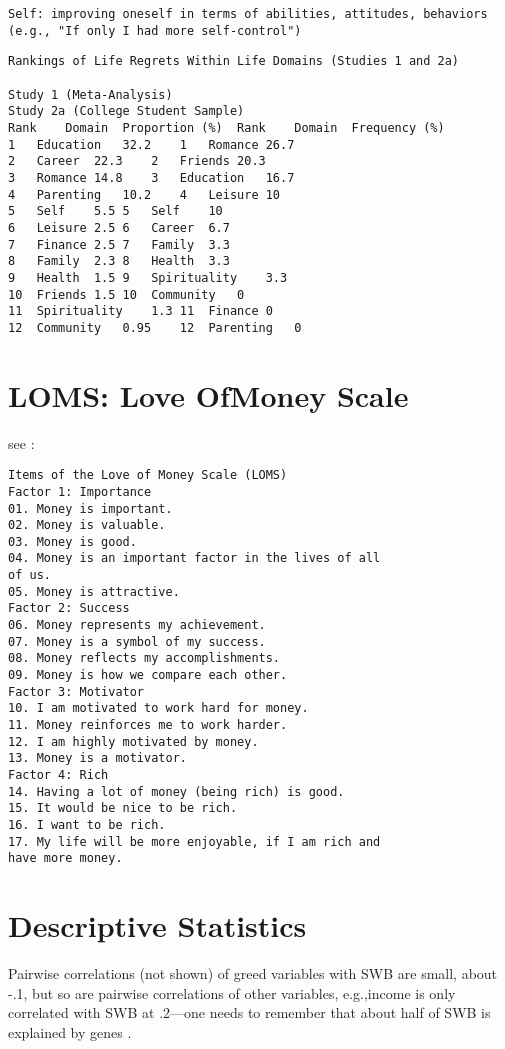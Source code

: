 \documentclass[10pt, letterpaper]{article}
\begin{document}
\begin{spacing}{1.8}
\begin{verbatim}
Self: improving oneself in terms of abilities, attitudes, behaviors 
(e.g., "If only I had more self-control")
\end{verbatim}


\begin{verbatim}
Rankings of Life Regrets Within Life Domains (Studies 1 and 2a)

Study 1 (Meta-Analysis)
Study 2a (College Student Sample)
Rank	Domain	Proportion (%)	Rank	Domain	Frequency (%)
1	Education	32.2	1	Romance	26.7
2	Career	22.3	2	Friends	20.3
3	Romance	14.8	3	Education	16.7
4	Parenting	10.2	4	Leisure	10
5	Self	5.5	5	Self	10
6	Leisure	2.5	6	Career	6.7
7	Finance	2.5	7	Family	3.3
8	Family	2.3	8	Health	3.3
9	Health	1.5	9	Spirituality	3.3
10	Friends	1.5	10	Community	0
11	Spirituality	1.3	11	Finance	0
12	Community	0.95	12	Parenting	0
\end{verbatim}

\section{LOMS: Love OfMoney Scale}

see \citet{tang2003income}:

\begin{verbatim}
Items of the Love of Money Scale (LOMS)
Factor 1: Importance
01. Money is important.
02. Money is valuable.
03. Money is good.
04. Money is an important factor in the lives of all
of us.
05. Money is attractive.
Factor 2: Success
06. Money represents my achievement.
07. Money is a symbol of my success.
08. Money reflects my accomplishments.
09. Money is how we compare each other.
Factor 3: Motivator
10. I am motivated to work hard for money.
11. Money reinforces me to work harder.
12. I am highly motivated by money.
13. Money is a motivator.
Factor 4: Rich
14. Having a lot of money (being rich) is good.
15. It would be nice to be rich.
16. I want to be rich.
17. My life will be more enjoyable, if I am rich and
have more money.
\end{verbatim}

\section{Descriptive Statistics}

%

%
%
%

Pairwise correlations (not shown) of greed variables with SWB are small, about
-.1, but so are pairwise correlations of other variables, e.g.,income is only correlated with SWB at  .2---one needs to remember that about half of SWB is explained by genes \citep{lykken96t}.



\end{spacing}
\end{document}
